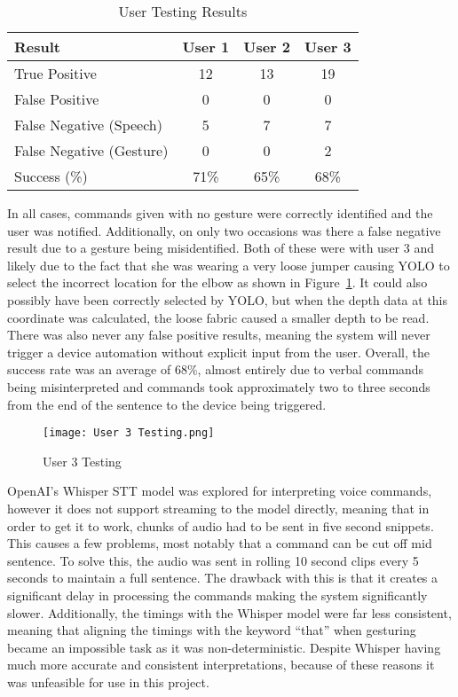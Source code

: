 \begin{table}[h!]
    \centering
    \begin{tabular}{|l|c|c|c|}
        \hline
        Result & User 1 & User 2 & User 3\\ \hline
        True Positive & 12 & 13 & 19 \\ \hline
        False Positive & 0 & 0 & 0 \\ \hline
        False Negative (Speech) & 5 & 7 & 7 \\ \hline
        False Negative (Gesture) & 0 & 0 & 2 \\ \hline
        Success (\%) & 71\% & 65\% & 68\% \\ \hline
    \end{tabular}
    \caption{User Testing Results}
    \label{tab:user_test_results}
\end{table}

In all cases, commands given with no gesture were correctly identified and the user was notified.
Additionally, on only two occasions was there a false negative result due to a gesture being misidentified.
Both of these were with user 3 and likely due to the fact that she was wearing a very loose jumper causing YOLO to select the incorrect location for the elbow as shown in Figure~\ref{fig:user3_testing}.
It could also possibly have been correctly selected by YOLO, but when the depth data at this coordinate was calculated, the loose fabric caused a smaller depth to be read.
There was also never any false positive results, meaning the system will never trigger a device automation without explicit input from the user.
Overall, the success rate was an average of 68\%, almost entirely due to verbal commands being misinterpreted and commands took approximately two to three seconds from the end of the sentence to the device being triggered.

\begin{figure}[!htb]
    \caption{User 3 Testing}
    \centering
    \texttt{[image: User 3 Testing.png]}
    \label{fig:user3_testing}
\end{figure}

OpenAI's Whisper STT model was explored for interpreting voice commands, however it does not support streaming to the model directly, meaning that in order to get it to work, chunks of audio had to be sent in five second snippets.
This causes a few problems, most notably that a command can be cut off mid sentence.
To solve this, the audio was sent in rolling 10 second clips every 5 seconds to maintain a full sentence.
The drawback with this is that it creates a significant delay in processing the commands making the system significantly slower.
Additionally, the timings with the Whisper model were far less consistent, meaning that aligning the timings with the keyword ``that'' when gesturing became an impossible task as it was non-deterministic.
Despite Whisper having much more accurate and consistent interpretations, because of these reasons it was unfeasible for use in this project.

